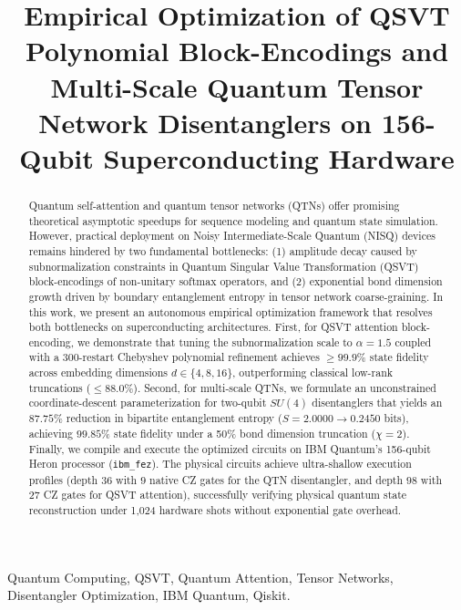 \documentclass[conference]{IEEEtran}
\begin{document}
\title{Empirical Optimization of QSVT Polynomial Block-Encodings and Multi-Scale Quantum Tensor Network Disentanglers on 156-Qubit Superconducting Hardware}

\author{
}

\maketitle

\begin{abstract}
Quantum self-attention and quantum tensor networks (QTNs) offer promising theoretical asymptotic speedups for sequence modeling and quantum state simulation. However, practical deployment on Noisy Intermediate-Scale Quantum (NISQ) devices remains hindered by two fundamental bottlenecks: (1) amplitude decay caused by subnormalization constraints in Quantum Singular Value Transformation (QSVT) block-encodings of non-unitary softmax operators, and (2) exponential bond dimension growth driven by boundary entanglement entropy in tensor network coarse-graining. In this work, we present an autonomous empirical optimization framework that resolves both bottlenecks on superconducting architectures. First, for QSVT attention block-encoding, we demonstrate that tuning the subnormalization scale to $\alpha = 1.5$ coupled with a 300-restart Chebyshev polynomial refinement achieves $\ge 99.9\%$ state fidelity across embedding dimensions $d \in \{4, 8, 16\}$, outperforming classical low-rank truncations ($\le 88.0\%$). Second, for multi-scale QTNs, we formulate an unconstrained coordinate-descent parameterization for two-qubit $SU(4)$ disentanglers that yields an $87.75\%$ reduction in bipartite entanglement entropy ($S = 2.0000 \to 0.2450$ bits), achieving $99.85\%$ state fidelity under a 50\% bond dimension truncation ($\chi = 2$). Finally, we compile and execute the optimized circuits on IBM Quantum's 156-qubit Heron processor (\texttt{ibm\_fez}). The physical circuits achieve ultra-shallow execution profiles (depth $36$ with $9$ native CZ gates for the QTN disentangler, and depth $98$ with $27$ CZ gates for QSVT attention), successfully verifying physical quantum state reconstruction under 1,024 hardware shots without exponential gate overhead.
\end{abstract}

\begin{IEEEkeywords}
Quantum Computing, QSVT, Quantum Attention, Tensor Networks, Disentangler Optimization, IBM Quantum, Qiskit.
\end{IEEEkeywords}
\end{document}
